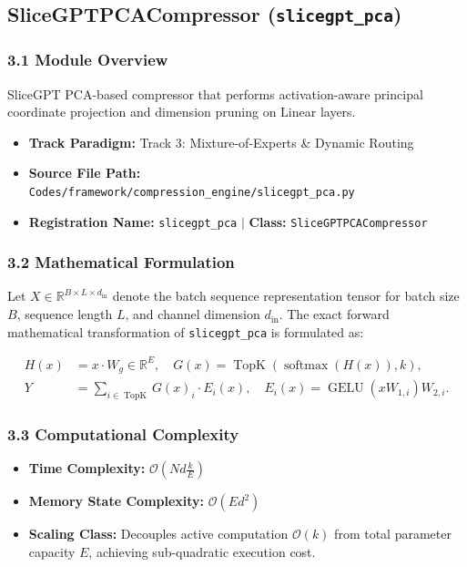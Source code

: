 \subsection{SliceGPTPCACompressor (\texttt{slicegpt\_pca})}
\label{sec:app_module_slicegpt\_pca}

\subsubsection*{3.1 Module Overview}
SliceGPT PCA-based compressor that performs activation-aware principal coordinate projection and dimension pruning on Linear layers.
\begin{itemize}
    \item \textbf{Track Paradigm:} Track 3: Mixture-of-Experts & Dynamic Routing
    \item \textbf{Source File Path:} \texttt{Codes/framework/compression\_engine/slicegpt\_pca.py}
    \item \textbf{Registration Name:} \texttt{slicegpt\_pca} $\mid$ \textbf{Class:} \texttt{SliceGPTPCACompressor}
\end{itemize}

\subsubsection*{3.2 Mathematical Formulation}
Let $X \in \mathbb{R}^{B \times L \times d_{\text{in}}}$ denote the batch sequence representation tensor for batch size $B$, sequence length $L$, and channel dimension $d_{\text{in}}$. The exact forward mathematical transformation of \texttt{slicegpt\_pca} is formulated as:

\begin{align}
H(x) &= x \cdot W_g \in \mathbb{R}^{E}, \quad G(x) = \operatorname{TopK}\left(\operatorname{softmax}(H(x)), k\right), \\
Y &= \sum_{i \in \operatorname{TopK}} G(x)_i \cdot E_i(x), \quad E_i(x) = \operatorname{GELU}(x W_{1, i}) W_{2, i}.
\end{align}


\subsubsection*{3.3 Computational Complexity}
\begin{itemize}
    \item \textbf{Time Complexity:} $\mathcal{O}(N d \frac{k}{E})$
    \item \textbf{Memory State Complexity:} $\mathcal{O}(E d^2)$
    \item \textbf{Scaling Class:} Decouples active computation $\mathcal{O}(k)$ from total parameter capacity $E$, achieving sub-quadratic execution cost.
\end{itemize}


